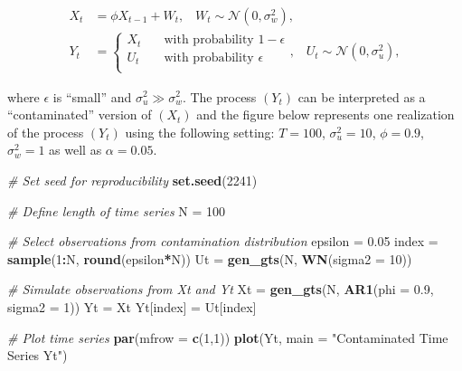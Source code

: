 \documentclass[]{book}
\newenvironment{Shaded}{\begin{snugshade}}{\end{snugshade}}
\newcommand{\CommentTok}[1]{\textcolor[rgb]{0.56,0.35,0.01}{\textit{#1}}}
\newcommand{\DataTypeTok}[1]{\textcolor[rgb]{0.13,0.29,0.53}{#1}}
\newcommand{\DecValTok}[1]{\textcolor[rgb]{0.00,0.00,0.81}{#1}}
\newcommand{\FloatTok}[1]{\textcolor[rgb]{0.00,0.00,0.81}{#1}}
\newcommand{\KeywordTok}[1]{\textcolor[rgb]{0.13,0.29,0.53}{\textbf{#1}}}
\newcommand{\NormalTok}[1]{#1}
\newcommand{\OperatorTok}[1]{\textcolor[rgb]{0.81,0.36,0.00}{\textbf{#1}}}
\newcommand{\StringTok}[1]{\textcolor[rgb]{0.31,0.60,0.02}{#1}}
\theoremstyle{definition}
\theoremstyle{definition}
\theoremstyle{definition}
\theoremstyle{remark}
\begin{document}
\[ 
    \begin{aligned}
    X_t &= \phi X_{t-1} + W_t, \;\;\; W_t \sim \mathcal{N}(0,\sigma_w^2),\\
    Y_t &= \begin{cases}
    X_t       & \quad \text{with probability } 1 - \epsilon\\
    U_t  & \quad \text{with probability } \epsilon\\
    \end{cases}, \;\;\; U_t \sim \mathcal{N}(0,\sigma_u^2),
    \end{aligned}
\]

where \(\epsilon\) is ``small'' and \(\sigma_u^2 \gg \sigma_w^2\). The
process \((Y_t)\) can be interpreted as a ``contaminated'' version of
\((X_t)\) and the figure below represents one realization of the process
\((Y_t)\) using the following setting: \(T = 100\), \(\sigma_u^2 = 10\),
\(\phi = 0.9\), \(\sigma_w^2 = 1\) as well as \(\alpha = 0.05\).

\begin{Shaded}
\begin{Highlighting}[]
\CommentTok{# Set seed for reproducibility}
\KeywordTok{set.seed}\NormalTok{(}\DecValTok{2241}\NormalTok{)}

\CommentTok{# Define length of time series}
\NormalTok{N =}\StringTok{ }\DecValTok{100}

\CommentTok{# Select observations from contamination distribution}
\NormalTok{epsilon =}\StringTok{ }\FloatTok{0.05}
\NormalTok{index =}\StringTok{ }\KeywordTok{sample}\NormalTok{(}\DecValTok{1}\OperatorTok{:}\NormalTok{N, }\KeywordTok{round}\NormalTok{(epsilon}\OperatorTok{*}\NormalTok{N))}
\NormalTok{Ut =}\StringTok{ }\KeywordTok{gen_gts}\NormalTok{(N, }\KeywordTok{WN}\NormalTok{(}\DataTypeTok{sigma2 =} \DecValTok{10}\NormalTok{))}

\CommentTok{# Simulate observations from Xt and Yt}
\NormalTok{Xt =}\StringTok{ }\KeywordTok{gen_gts}\NormalTok{(N, }\KeywordTok{AR1}\NormalTok{(}\DataTypeTok{phi =} \FloatTok{0.9}\NormalTok{, }\DataTypeTok{sigma2 =} \DecValTok{1}\NormalTok{))}
\NormalTok{Yt =}\StringTok{ }\NormalTok{Xt}
\NormalTok{Yt[index] =}\StringTok{ }\NormalTok{Ut[index]}

\CommentTok{# Plot time series}
\KeywordTok{par}\NormalTok{(}\DataTypeTok{mfrow =} \KeywordTok{c}\NormalTok{(}\DecValTok{1}\NormalTok{,}\DecValTok{1}\NormalTok{))}
\KeywordTok{plot}\NormalTok{(Yt, }\DataTypeTok{main =} \StringTok{"Contaminated Time Series Yt"}\NormalTok{)}
\end{Highlighting}
\end{Shaded}
\end{document}
